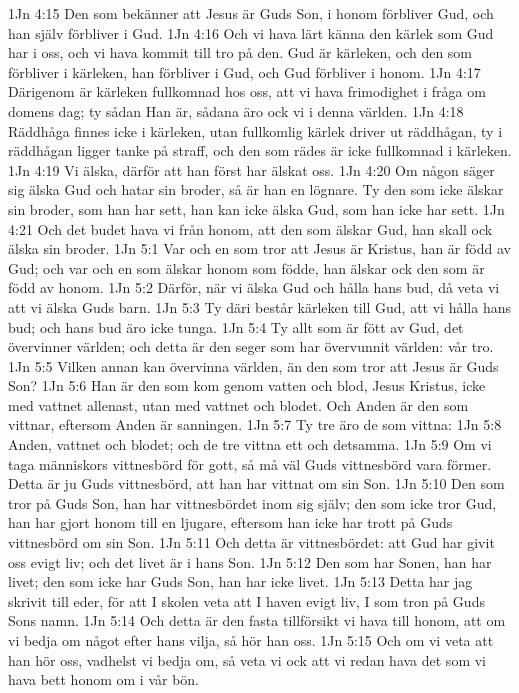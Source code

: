 1Jn 4:15  Den som bekänner att Jesus är Guds Son, i honom förbliver Gud, och han själv förbliver i Gud.
1Jn 4:16  Och vi hava lärt känna den kärlek som Gud har i oss, och vi hava kommit till tro på den. Gud är kärleken, och den som förbliver i kärleken, han förbliver i Gud, och Gud förbliver i honom.
1Jn 4:17  Därigenom är kärleken fullkomnad hos oss, att vi hava frimodighet i fråga om domens dag; ty sådan Han är, sådana äro ock vi i denna världen.
1Jn 4:18  Räddhåga finnes icke i kärleken, utan fullkomlig kärlek driver ut räddhågan, ty i räddhågan ligger tanke på straff, och den som rädes är icke fullkomnad i kärleken.
1Jn 4:19  Vi älska, därför att han först har älskat oss.
1Jn 4:20  Om någon säger sig älska Gud och hatar sin broder, så är han en lögnare. Ty den som icke älskar sin broder, som han har sett, han kan icke älska Gud, som han icke har sett.
1Jn 4:21  Och det budet hava vi från honom, att den som älskar Gud, han skall ock älska sin broder.
1Jn 5:1  Var och en som tror att Jesus är Kristus, han är född av Gud; och var och en som älskar honom som födde, han älskar ock den som är född av honom.
1Jn 5:2  Därför, när vi älska Gud och hålla hans bud, då veta vi att vi älska Guds barn.
1Jn 5:3  Ty däri består kärleken till Gud, att vi hålla hans bud; och hans bud äro icke tunga.
1Jn 5:4  Ty allt som är fött av Gud, det övervinner världen; och detta är den seger som har övervunnit världen: vår tro.
1Jn 5:5  Vilken annan kan övervinna världen, än den som tror att Jesus är Guds Son?
1Jn 5:6  Han är den som kom genom vatten och blod, Jesus Kristus, icke med vattnet allenast, utan med vattnet och blodet. Och Anden är den som vittnar, eftersom Anden är sanningen.
1Jn 5:7  Ty tre äro de som vittna:
1Jn 5:8  Anden, vattnet och blodet; och de tre vittna ett och detsamma.
1Jn 5:9  Om vi taga människors vittnesbörd för gott, så må väl Guds vittnesbörd vara förmer. Detta är ju Guds vittnesbörd, att han har vittnat om sin Son.
1Jn 5:10  Den som tror på Guds Son, han har vittnesbördet inom sig själv; den som icke tror Gud, han har gjort honom till en ljugare, eftersom han icke har trott på Guds vittnesbörd om sin Son.
1Jn 5:11  Och detta är vittnesbördet: att Gud har givit oss evigt liv; och det livet är i hans Son.
1Jn 5:12  Den som har Sonen, han har livet; den som icke har Guds Son, han har icke livet.
1Jn 5:13  Detta har jag skrivit till eder, för att I skolen veta att I haven evigt liv, I som tron på Guds Sons namn.
1Jn 5:14  Och detta är den fasta tillförsikt vi hava till honom, att om vi bedja om något efter hans vilja, så hör han oss.
1Jn 5:15  Och om vi veta att han hör oss, vadhelst vi bedja om, så veta vi ock att vi redan hava det som vi hava bett honom om i vår bön.
